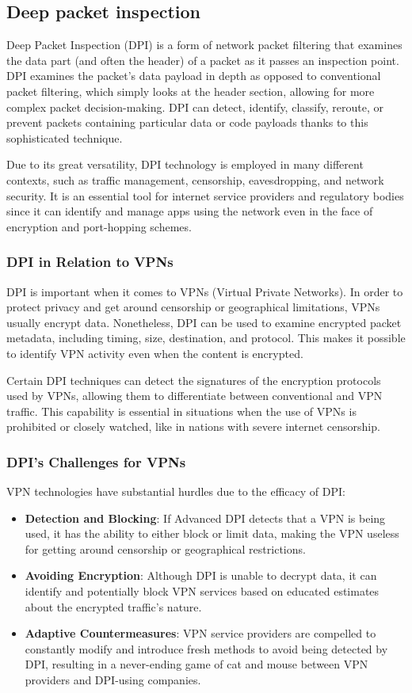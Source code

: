 \documentclass[12pt, fleqn, a4paper]{article}
\begin{document}
\subsection{Deep packet inspection}
Deep Packet Inspection (DPI) is a form of network packet filtering that examines the data part (and often the header) of a packet as it passes an inspection point. DPI examines the packet's data payload in depth as opposed to conventional packet filtering, which simply looks at the header section, allowing for more complex packet decision-making. DPI can detect, identify, classify, reroute, or prevent packets containing particular data or code payloads thanks to this sophisticated technique.

Due to its great versatility, DPI technology is employed in many different contexts, such as traffic management, censorship, eavesdropping, and network security. It is an essential tool for internet service providers and regulatory bodies since it can identify and manage apps using the network even in the face of encryption and port-hopping schemes.

\subsubsection{DPI in Relation to VPNs}
DPI is important when it comes to VPNs (Virtual Private Networks). In order to protect privacy and get around censorship or geographical limitations, VPNs usually encrypt data. Nonetheless, DPI can be used to examine encrypted packet metadata, including timing, size, destination, and protocol. This makes it possible to identify VPN activity even when the content is encrypted.

Certain DPI techniques can detect the signatures of the encryption protocols used by VPNs, allowing them to differentiate between conventional and VPN traffic. This capability is essential in situations when the use of VPNs is prohibited or closely watched, like in nations with severe internet censorship.

\subsubsection{DPI's Challenges for VPNs}
VPN technologies have substantial hurdles due to the efficacy of DPI:
\begin{itemize}
  \item \textbf{Detection and Blocking}: If Advanced DPI detects that a VPN is being used, it has the ability to either block or limit data, making the VPN useless for getting around censorship or geographical restrictions.
  \item \textbf{Avoiding Encryption}: Although DPI is unable to decrypt data, it can identify and potentially block VPN services based on educated estimates about the encrypted traffic's nature.
  \item \textbf{Adaptive Countermeasures}: VPN service providers are compelled to constantly modify and introduce fresh methods to avoid being detected by DPI, resulting in a never-ending game of cat and mouse between VPN providers and DPI-using companies.
\end{itemize}
\end{document}
